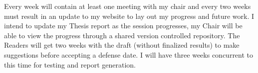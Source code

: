 Every week will contain at least one meeting with my chair and every two weeks
must result in an update to my website to lay out my progress and future work. 
I intend to update my Thesis report as the session progresses, my Chair will be 
able to view the progress through a shared version controlled repository. The
Readers will get two weeks with the draft (without finalized results) to make
suggestions before accepting a defense date. I will have three weeks concurrent
to this time for testing and report generation.


\pagebreak{}

\singlespacing




